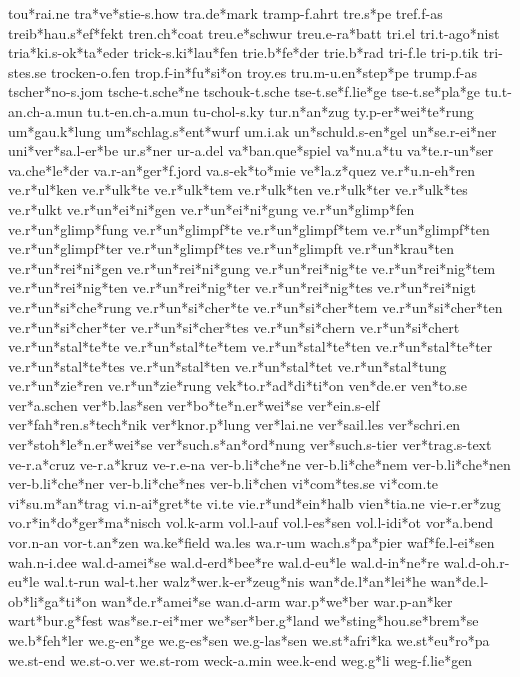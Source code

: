 tou*rai.ne
tra*ve*stie-s.how
tra.de*mark
tramp-f.ahrt
tre.s*pe
tref.f-as
treib*hau.s*ef*fekt
tren.ch*coat
treu.e*schwur
treu.e-ra*batt
tri.el
tri.t-ago*nist
tria*ki.s-ok*ta*eder
trick-s.ki*lau*fen
trie.b*fe*der
trie.b*rad
tri-f.le
tri-p.tik
tri-stes.se
trocken-o.fen
trop.f-in*fu*si*on
troy.es
tru.m-u.en*step*pe
trump.f-as
tscher*no-s.jom
tsche-t.sche*ne
tschouk-t.sche
tse-t.se*f.lie*ge
tse-t.se*pla*ge
tu.t-an.ch-a.mun
tu.t-en.ch-a.mun
tu-chol-s.ky
tur.n*an*zug
ty.p-er*wei*te*rung
um*gau.k*lung
um*schlag.s*ent*wurf
um.i.ak
un*schuld.s-en*gel
un*se.r-ei*ner
uni*ver*sa.l-er*be
ur.s*ner
ur-a.del
va*ban.que*spiel
va*nu.a*tu
va*te.r-un*ser
va.che*le*der
va.r-an*ger*f.jord
va.s-ek*to*mie
ve*la.z*quez
ve.r*u.n-eh*ren
ve.r*ul*ken
ve.r*ulk*te
ve.r*ulk*tem
ve.r*ulk*ten
ve.r*ulk*ter
ve.r*ulk*tes
ve.r*ulkt
ve.r*un*ei*ni*gen
ve.r*un*ei*ni*gung
ve.r*un*glimp*fen
ve.r*un*glimp*fung
ve.r*un*glimpf*te
ve.r*un*glimpf*tem
ve.r*un*glimpf*ten
ve.r*un*glimpf*ter
ve.r*un*glimpf*tes
ve.r*un*glimpft
ve.r*un*krau*ten
ve.r*un*rei*ni*gen
ve.r*un*rei*ni*gung
ve.r*un*rei*nig*te
ve.r*un*rei*nig*tem
ve.r*un*rei*nig*ten
ve.r*un*rei*nig*ter
ve.r*un*rei*nig*tes
ve.r*un*rei*nigt
ve.r*un*si*che*rung
ve.r*un*si*cher*te
ve.r*un*si*cher*tem
ve.r*un*si*cher*ten
ve.r*un*si*cher*ter
ve.r*un*si*cher*tes
ve.r*un*si*chern
ve.r*un*si*chert
ve.r*un*stal*te*te
ve.r*un*stal*te*tem
ve.r*un*stal*te*ten
ve.r*un*stal*te*ter
ve.r*un*stal*te*tes
ve.r*un*stal*ten
ve.r*un*stal*tet
ve.r*un*stal*tung
ve.r*un*zie*ren
ve.r*un*zie*rung
vek*to.r*ad*di*ti*on
ven*de.er
ven*to.se
ver*a.schen
ver*b.las*sen
ver*bo*te*n.er*wei*se
ver*ein.s-elf
ver*fah*ren.s*tech*nik
ver*knor.p*lung
ver*lai.ne
ver*sail.les
ver*schri.en
ver*stoh*le*n.er*wei*se
ver*such.s*an*ord*nung
ver*such.s-tier
ver*trag.s-text
ve-r.a*cruz
ve-r.a*kruz
ve-r.e-na
ver-b.li*che*ne
ver-b.li*che*nem
ver-b.li*che*nen
ver-b.li*che*ner
ver-b.li*che*nes
ver-b.li*chen
vi*com*tes.se
vi*com.te
vi*su.m*an*trag
vi.n-ai*gret*te
vi.te
vie.r*und*ein*halb
vien*tia.ne
vie-r.er*zug
vo.r*in*do*ger*ma*nisch
vol.k-arm
vol.l-auf
vol.l-es*sen
vol.l-idi*ot
vor*a.bend
vor.n-an
vor-t.an*zen
wa.ke*field
wa.les
wa.r-um
wach.s*pa*pier
waf*fe.l-ei*sen
wah.n-i.dee
wal.d-amei*se
wal.d-erd*bee*re
wal.d-eu*le
wal.d-in*ne*re
wal.d-oh.r-eu*le
wal.t-run
wal-t.her
walz*wer.k-er*zeug*nis
wan*de.l*an*lei*he
wan*de.l-ob*li*ga*ti*on
wan*de.r*amei*se
wan.d-arm
war.p*we*ber
war.p-an*ker
wart*bur.g*fest
was*se.r-ei*mer
we*ser*ber.g*land
we*sting*hou.se*brem*se
we.b*feh*ler
we.g-en*ge
we.g-es*sen
we.g-las*sen
we.st*afri*ka
we.st*eu*ro*pa
we.st-end
we.st-o.ver
we.st-rom
weck-a.min
wee.k-end
weg.g*li
weg-f.lie*gen
